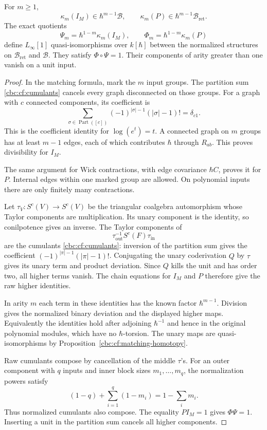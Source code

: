 \begin{theorem}\label{cbc:cf:higher}
For $m\geq1$,
\[
 \kappa_m(I_M)\in\hbar^{m-1}\mathcal B,\qquad
 \kappa_m(P)\in\hbar^{m-1}\mathcal B_{\mathrm{ret}}.
\]
The exact quotients
\[
 \Psi_m=\hbar^{1-m}\kappa_m(I_M),\qquad
 \Phi_m=\hbar^{1-m}\kappa_m(P)
\]
define $L_\infty[1]$ quasi-isomorphisms over $k[\hbar]$
between the normalized structures on $\mathcal B_{\mathrm{ret}}$
and $\mathcal B$. They satisfy $\Phi\circ\Psi=1$.
Their components of arity greater than one vanish on a unit
input.
\end{theorem}
\begin{proof}
In the matching formula, mark the $m$ input groups.
The partition sum \eqref{cbc:cf:cumulants} cancels every graph
disconnected on those groups. For a graph with $c$ connected
components, its coefficient is
\[
 \sum_{\sigma\in\operatorname{Part}([c])}
       (-1)^{|\sigma|-1}(|\sigma|-1)!=\delta_{c1}.
\]
This is the coefficient identity for $\log(e^t)=t$.
A connected graph on $m$ groups
has at least $m-1$ edges, each of which contributes $\hbar$
through $R_{ab}$. This proves divisibility for $I_M$.

The same argument for Wick contractions, with edge covariance
$\hbar C$, proves it for $P$. Internal edges within one
marked group are allowed. On polynomial inputs there are only
finitely many contractions.

Let $\tau_V:S^c(V)\to S^c(V)$ be the triangular coalgebra
automorphism whose Taylor components are multiplication.
Its unary component is the identity, so conilpotence gives
an inverse. The Taylor components of
\[
 \tau_{\mathrm{out}}^{-1}S^c(F)\tau_{\mathrm{in}}
\]
are the cumulants \eqref{cbc:cf:cumulants}: inversion of the
partition sum gives the coefficient
$(-1)^{|\pi|-1}(|\pi|-1)!$.
Conjugating the unary coderivation $Q$ by $\tau$ gives its
unary term and product deviation. Since $Q$ kills the unit
and has order two, all higher terms vanish.
The chain equations for $I_M$ and $P$ therefore give the
raw higher identities.

In arity $m$ each term in these identities has the known factor
$\hbar^{m-1}$. Division gives the normalized binary deviation
and the displayed higher maps. Equivalently the identities hold
after adjoining $\hbar^{-1}$ and hence in the original
polynomial modules, which have no $\hbar$-torsion.
The unary maps are quasi-isomorphisms by
Proposition~\ref{cbc:cf:matching-homotopy}.

Raw cumulants compose by cancellation of the middle $\tau$'s.
For an outer component with $q$ inputs and inner block sizes
$m_1,\ldots,m_q$, the normalization powers satisfy
\[
 (1-q)+\sum_{i=1}^q(1-m_i)=1-\sum_i m_i.
\]
Thus normalized cumulants also compose. The equality $PI_M=1$
gives $\Phi\Psi=1$. Inserting a unit in the partition sum
cancels all higher components.
\end{proof}

